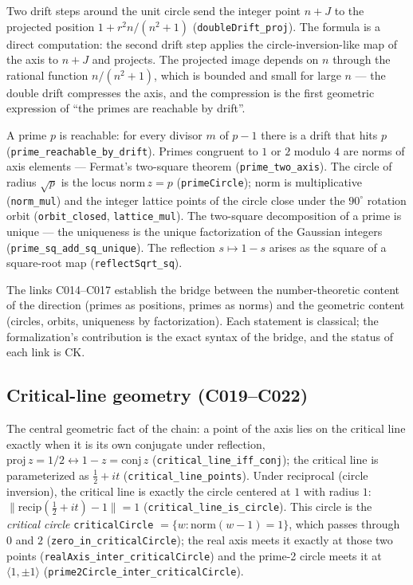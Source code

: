 \documentclass[sigplan,10pt,anonymous,review]{acmart}
\begin{document}
Two drift steps around the unit circle send the integer point $n + J$ to
the projected position $1 + r^2 n / (n^2 + 1)$
(\texttt{doubleDrift\_proj}). The formula is a direct computation: the
second drift step applies the circle-inversion-like map of the axis to
$n + J$ and projects. The projected image depends on $n$ through the
rational function $n/(n^2+1)$, which is bounded and small for large $n$
--- the double drift compresses the axis, and the compression is the
first geometric expression of ``the primes are reachable by drift''.

A prime $p$ is reachable: for every divisor $m$ of $p-1$ there is a
drift that hits $p$ (\texttt{prime\_reachable\_by\_drift}). Primes
congruent to $1$ or $2$ modulo $4$ are norms of axis elements ---
Fermat's two-square theorem (\texttt{prime\_two\_axis}). The circle of
radius $\sqrt p$ is the locus $\mathrm{norm}\, z = p$
(\texttt{primeCircle}); norm is multiplicative (\texttt{norm\_mul}) and
the integer lattice points of the circle close under the
$90^\circ$ rotation orbit (\texttt{orbit\_closed},
\texttt{lattice\_mul}). The two-square decomposition of a prime is unique
--- the uniqueness is the unique factorization of the Gaussian integers
(\texttt{prime\_sq\_add\_sq\_unique}). The reflection $s \mapsto 1-s$
arises as the square of a square-root map (\texttt{reflectSqrt\_sq}).

The links C014--C017 establish the bridge between the number-theoretic
content of the direction (primes as positions, primes as norms) and the
geometric content (circles, orbits, uniqueness by factorization). Each
statement is classical; the formalization's contribution is the exact
syntax of the bridge, and the status of each link is
\textcolor{classical}{CK}.

\subsection{Critical-line geometry (C019--C022)}

The central geometric fact of the chain: a point of the axis lies on the
critical line exactly when it is its own conjugate under reflection,
$\mathrm{proj}\, z = 1/2 \leftrightarrow 1 - z = \mathrm{conj}\, z$
(\texttt{critical\_line\_iff\_conj}); the critical line is parameterized
as $\frac12 + it$ (\texttt{critical\_line\_points}). Under reciprocal
(circle inversion), the critical line is exactly the circle centered at
$1$ with radius $1$: $\|\mathrm{recip}(\frac12 + it) - 1\| = 1$
(\texttt{critical\_line\_is\_circle}). This circle is the
\emph{critical circle} \texttt{criticalCircle} $= \{w :
\mathrm{norm}(w-1) = 1\}$, which passes through $0$ and $2$
(\texttt{zero\_in\_criticalCircle}); the real axis meets it exactly at
those two points (\texttt{realAxis\_inter\_criticalCircle}) and the
prime-2 circle meets it at $\langle 1, \pm 1\rangle$
(\texttt{prime2Circle\_inter\_criticalCircle}).
\end{document}
